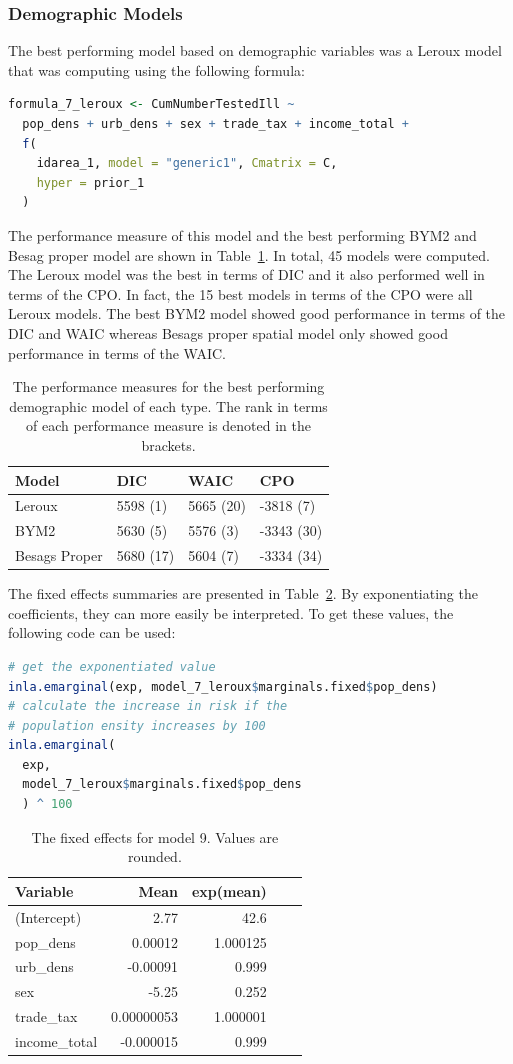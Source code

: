 \subsubsection{Demographic Models}
The best performing model based on demographic variables was a Leroux model that was computing using the following formula:
\begin{lstlisting}[language=R]
formula_7_leroux <- CumNumberTestedIll ~
  pop_dens + urb_dens + sex + trade_tax + income_total +
  f(
    idarea_1, model = "generic1", Cmatrix = C,
    hyper = prior_1
  )
\end{lstlisting}
The performance measure of this model and the best performing BYM2 and Besag proper model are shown in Table~\ref{demoGermany}. In total, 45 models were computed. The Leroux model was the best in terms of DIC and it also performed well in terms of the CPO. In fact, the 15 best models in terms of the CPO were all Leroux models. The best BYM2 model showed good performance in terms of the DIC and WAIC whereas Besags proper spatial model only showed good performance in terms of the WAIC.
\begin{table}[H] 
\caption{The performance measures for the best performing demographic model of each type. The rank in terms of each performance measure is denoted in the brackets. \label{demoGermany}}
\begin{tabular}{l l l l}
\toprule
\textbf{Model}	& \textbf{DIC}	& \textbf{WAIC} & \textbf{CPO} \\
\midrule
Leroux & 5598 (1) & 5665 (20) & -3818 (7) \\
BYM2 & 5630 (5) & 5576 (3) & -3343 (30)\\
Besags Proper  & 5680 (17) & 5604 (7) & -3334 (34) \\
\bottomrule
\end{tabular}
\end{table}
The fixed effects summaries are presented in Table~\ref{fixedDemoGermany}. By exponentiating the coefficients, they can more easily be interpreted. To get these values, the following code can be used:
\begin{lstlisting}[language=R]
# get the exponentiated value
inla.emarginal(exp, model_7_leroux$marginals.fixed$pop_dens)
# calculate the increase in risk if the 
# population ensity increases by 100
inla.emarginal(
  exp,
  model_7_leroux$marginals.fixed$pop_dens
  ) ^ 100
\end{lstlisting}
\begin{table}[H] 
\caption{The fixed effects for model 9. Values are rounded. \label{fixedDemoGermany}}
\begin{tabular}{l r r r r}
\toprule
\textbf{Variable}	& \textbf{Mean}	& \textbf{exp(mean)} \\
\midrule
(Intercept) & 2.77 & 42.6\\
pop\_dens & 0.00012 & 1.000125\\
urb\_dens &  -0.00091 & 0.999\\
sex & -5.25 & 0.252\\
trade\_tax & 0.00000053& 1.000001 \\
income\_total & -0.000015 & 0.999\\
\bottomrule
\end{tabular}
\end{table}
